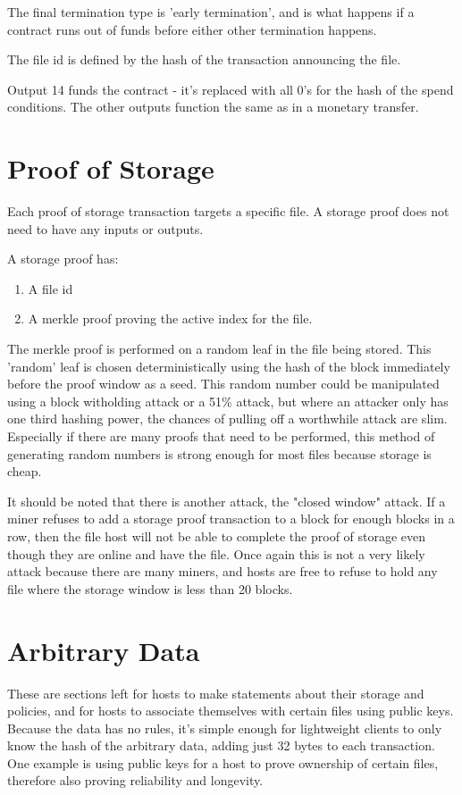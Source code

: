 \documentclass[twocolumn]{article}
\begin{document}
The final termination type is 'early termination', and is what happens if a contract runs out of funds before either other termination happens.

The file id is defined by the hash of the transaction announcing the file.

Output 14 funds the contract - it's replaced with all 0's for the hash of the spend conditions.
The other outputs function the same as in a monetary transfer.

\section{Proof of Storage}
Each proof of storage transaction targets a specific file.
A storage proof does not need to have any inputs or outputs.

A storage proof has:
\begin{enumerate}
	\item A file id
	\item A merkle proof proving the active index for the file.
\end{enumerate}

The merkle proof is performed on a random leaf in the file being stored.
This 'random' leaf is chosen deterministically using the hash of the block immediately before the proof window as a seed.
This random number could be manipulated using a block witholding attack or a 51\% attack, but where an attacker only has one third hashing power, the chances of pulling off a worthwhile attack are slim.
Especially if there are many proofs that need to be performed, this method of generating random numbers is strong enough for most files because storage is cheap.


It should be noted that there is another attack, the "closed window" attack.
If a miner refuses to add a storage proof transaction to a block for enough blocks in a row, then the file host will not be able to complete the proof of storage even though they are online and have the file.
Once again this is not a very likely attack because there are many miners, and hosts are free to refuse to hold any file where the storage window is less than 20 blocks.

\section{Arbitrary Data}
These are sections left for hosts to make statements about their storage and policies, and for hosts to associate themselves with certain files using public keys.
Because the data has no rules, it's simple enough for lightweight clients to only know the hash of the arbitrary data, adding just 32 bytes to each transaction.
One example is using public keys for a host to prove ownership of certain files, therefore also proving reliability and longevity.
\end{document}
